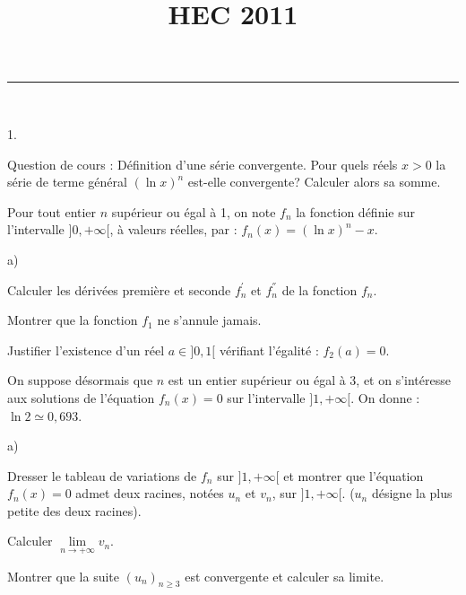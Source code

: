\documentclass[11pt]{article}%
\title{\bf \vspace{-1.6cm} HEC 2011} %
\author{} %
\date{} %
\begin{document}
\maketitle %
\vspace{-1.2cm}\hrule %
\thispagestyle{fancy}

\vspace*{.2cm}


 
\begin{exerciceAP}~
  \begin{noliste}{1.}
    \setlength{\itemsep}{2mm}
  \item Question de cours : Définition d'une série convergente. Pour
    quels réels $x >0$ la série de terme général $(\ln x)^n$ est-elle
    convergente? Calculer alors sa somme.

  \item Pour tout entier $n$ supérieur ou égal à 1, on note $f_n$ la
    fonction définie sur l'intervalle $]0,+\infty[$, à valeurs
    réelles, par : $f_n(x)= (\ln x)^n-x$.
    \begin{noliste}{a)}
    \setlength{\itemsep}{2mm}
    \item Calculer les dérivées première et seconde $f_n^{'}$ et
      $f_n^{''}$ de la fonction $f_n$.
    \item Montrer que la fonction $f_1$ ne s'annule jamais.
    \item Justifier l'existence d'un réel $a \in ]0,1[$ vérifiant
      l'égalité : $f_2(a)=0$.
    \end{noliste}
  \item On suppose désormais que $n$ est un entier supérieur ou égal à
    3, et on s'intéresse aux solutions de l'équation $f_n(x)=0$ sur
    l'intervalle $]1,+\infty[$. On donne : $\ln 2 \simeq 0,693$.
    \begin{noliste}{a)}
    \setlength{\itemsep}{2mm}
    \item Dresser le tableau de variations de $f_n$ sur $]1,+\infty[$
      et montrer que l'équation $f_n(x)=0$ admet deux racines, notées
      $u_n$ et $v_n$, sur $]1,+\infty[$. ($u_n$ désigne la plus petite
      des deux racines).
    \item Calculer $\lim \limits_{n \to +\infty} v_n$.
    \end{noliste}
  \item Montrer que la suite $(u_n)_{n \geq 3} $ est convergente et
    calculer sa limite.
  \end{noliste}
\end{exerciceAP}
\end{document}
